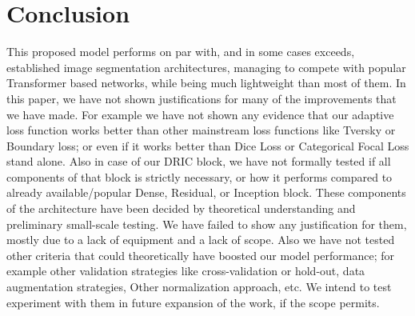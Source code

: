 
\section{Conclusion}

{\sloppy This proposed model performs on par with, and in some cases exceeds, established image segmentation architectures, managing to compete with popular Transformer based networks, while being much lightweight than most of them. In this paper, we have not shown justifications for many of the improvements that we have made. For example we have not shown any evidence that our adaptive loss function works better than other mainstream loss functions like Tversky or Boundary loss; or even if it works better than Dice Loss or Categorical Focal Loss stand alone. Also in case of our DRIC block, we have not formally tested if all components of that block is strictly necessary, or how it performs compared to already available/popular Dense, Residual, or Inception block. These components of  the architecture have been decided by theoretical understanding and preliminary small-scale testing. We have failed to show any justification for them, mostly due to a lack of equipment and a lack of scope. Also we have not tested other criteria that could theoretically have boosted our model performance; for example other validation strategies like cross-validation or hold-out, data augmentation strategies, Other normalization approach, etc. We intend to test experiment with them in future expansion of the work, if the scope permits.\par}
